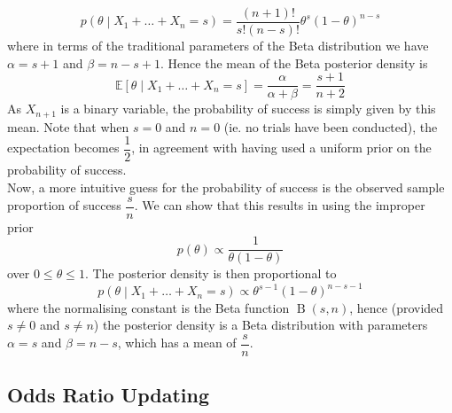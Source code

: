 \documentclass[11pt]{report} %
\begin{document}
\begin{equation}
p\left(\theta\middle|X_{1} + \dots + X_{n} = s\right) = \dfrac{\left(n + 1\right)!}{s!\left(n  - s\right)!}\theta^{s}\left(1 - \theta\right)^{n - s}
\end{equation}
where in terms of the traditional parameters of the Beta distribution we have $\alpha = s + 1$ and $\beta = n - s + 1$. Hence the mean of the Beta posterior density is
\begin{equation}
\mathbb{E}\left[\theta\middle|X_{1} + \dots + X_{n} = s\right] = \dfrac{\alpha}{\alpha + \beta} = \dfrac{s + 1}{n + 2} 
\end{equation}
As $X_{n + 1}$ is a binary variable, the probability of success is simply given by this mean. Note that when $s = 0$ and $n = 0$ (ie. no trials have been conducted), the expectation becomes $\dfrac{1}{2}$, in agreement with having used a uniform prior on the probability of success. \\

Now, a more intuitive guess for the probability of success is the observed sample proportion of success $\dfrac{s}{n}$. We can show that this results in using the improper prior
\begin{equation}
p\left(\theta\right) \propto \dfrac{1}{\theta\left(1 - \theta\right)}
\end{equation}
over $0 \leq \theta \leq 1$. The posterior density is then proportional to
\begin{equation}
p\left(\theta\middle|X_{1} + \dots + X_{n} = s\right) \propto \theta^{s - 1}\left(1 - \theta\right)^{n - s - 1}
\end{equation}
where the normalising constant is the Beta function $\operatorname{B}\left(s, n\right)$, hence (provided $s \neq 0$ and $s \neq n$) the posterior density is a Beta distribution with parameters $\alpha = s$ and $\beta = n - s$, which has a mean of $\dfrac{s}{n}$.

\subsection{Odds Ratio Updating}
\end{document}
